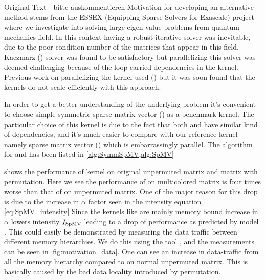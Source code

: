  
{\GW Original Text - bitte auskommentieren
Motivation for developing an alternative method stems from the ESSEX (Equipping Sparse Solvers for Exascale) project \cite{ESSEX}
 where we investigate into solving large eigen-value problems from quantum mechanics field. In this context having a robust iterative solver was inevitable, due to the poor condition number of the matrices that appear in this field. Kaczmarz (\KACZ) solver was found to be satisfactory but parallelizing this solver was deemed challenging because of the loop-carried dependencies in the kernel. Previous work on parallelizing the \KACZ kernel used \MCfull (\MC) \cite{feast_mc} but it was soon found that the kernels do not scale efficiently with this approach.

  In order to get a better understanding of the underlying problem it's convenient to choose simple symmetric sparse matrix vector (\SymmSpmv) as a benchmark kernel. The particular choice of this kernel is due to the fact that both \KACZ and \SymmSpmv have similar kind of dependencies, and it's much easier to compare with our reference kernel namely sparse matrix vector (\SpMV) which is embarrassingly parallel. The algorithm for \SymmSpmv  and \SpMV has been listed in \cref{alg:SymmSpMV,alg:SpMV}
  }
  
   
 
  

  shows the performance of \SpMV kernel on original unpermuted matrix and matrix with \MC permutation. Here we see the performance of \SpMV on multicolored matrix is  four times  worse than that of  \SpMV on unpermuted matrix. One of the major reason for this drop is due to the increase in $\alpha$ factor seen in the intensity equation \cref{eq:SpMV_intensity}  Since the kernels like \SpMV  are mainly memory bound increase in $\alpha$ lowers intensity $I_\mathrm{SpMV}$ leading to a drop of performance as predicted by \roofline model \cite{Williams_roofline}. This could easily be demonstrated by measuring the data traffic between different memory hierarchies.  We do this using the \LIKWID tool \cite{LIKWID}, and the measurements can be seen in \cref{fig:motivation_data}. One can see an increase in data-traffic from all the memory hierarchy compared to \SpMV on normal unpermuted matrix. This is basically caused by the bad data locality introduced by \MCfull permutation.
 

